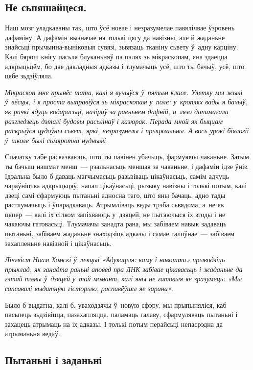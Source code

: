 \subsection*{Не сьпяшайцеся.}

Наш мозг уладкаваны так, што ўсё новае і незразумелае павялічвае ўзровень дафаміну. А дафамін вызначае ня толькі цягу да навізны, але й жаданьне знайсьці прычынна-выніковыя сувязі, зьвязаць тканіну сьвету ў~адну карціну. Калі бярош кнігу пасьля блуканьняў па палях зь мікраскопам, яна здаецца адкрыцьцём, бо дае дакладныя адказы і тлумачыць усё, што ты бачыў, усё, што цябе зьдзіўляла. 

\emph{Мікраскоп мне прынёс тата, калі я вучыўся ў~пятым класе. Улетку мы жылі ў~вёсцы, і я проста выправіўся зь мікраскопам у~поле: у~кроплях вады я бачыў, як рачкі ядуць водарасьці, назіраў за раеньнем дафній, а~лязо дапамагала разгледзець дэталі будовы расьлінаў і казюрак. Перада мной як быццам раскрыўся цудоўны сьвет, яркі, незразумелы і прыцягальны. А вось урокі біялогіі ў~школе былі сьмяротна нуднымі.}

Спачатку табе расказваюць, што ты павінен убачыць, фармуючы чаканьне. Затым ты бачыш нашмат менш~--- рэальнасьць меншая за чаканьне, і дафамін ідзе ўніз. Ідэальна было б даваць магчымасьць разьвіваць цікаўнасьць, самім адчуць чараўніцтва адкрыцьцяў, напал цікаўнасьці, рызыку навізны і толькі потым, калі дзеці самі сфармуюць пытаньні адносна таго, што яны бачаць, адно тады растлумачыць і ўпарадкаваць. Атрымліваць веды трэба сьвядома, а~не як цяпер~--- калі іх сілком запіхваюць у~дзяцей, не пытаючыся іх згоды і не чакаючы гатовасьці. Тлумачачы занадта рана, мы забіваем навык задаваць пытаньні, забіваем жаданьне знаходзіць адказы і самае галоўнае~--- забіваем захапленьне навізной і цікаўнасьць.

\emph{Лінгвіст Ноам Хомскі ў~лекцыі «Адукацыя: каму і навошта» прыводзіць прыклад, як занадта раньні аповед пра ДНК забівае цікавасьць і жаданьне да гэтай тэмы ў~дзяцей у~той момант, калі яны не гатовыя яе зразумець: «Мы сапсавалі выдатную гісторыю, распавёўшы яе зарана».}

Было б выдатна, калі б, уваходзячы ў~новую сфэру, мы прыпыняліся, каб пасьпець зьдзівіцца, пазахапляцца, паламаць галаву, сфармуляваць пытаньні і захацець атрымаць на іх адказы. І толькі потым перайсьці непасрэдна да атрыманьня ведаў.

\subsection*{Пытаньні і заданьні}

